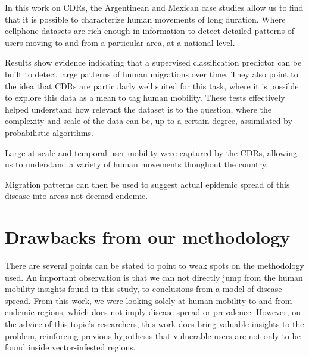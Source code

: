 In this work on CDRs, the Argentinean and Mexican case studies allow us to find that it is possible to characterize human movements of long duration.
Where cellphone datasets are rich enough in information to detect detailed patterns of users moving to and from a particular area, at a national level.


Results show evidence indicating that a supervised classification predictor can be built to detect large patterns of human migrations over time.
They also point to the idea that CDRs are particularly well suited for this task, where it is possible to explore this data as a mean to tag human mobility.
These tests effectively helped understand how relevant the dataset is to the question, where the complexity and scale of the data can be, up to a certain degree, assimilated by probabilistic algorithms.

Large at-scale and temporal user mobility were captured by the CDRs, allowing us to understand a variety of human movements thoughout the country.




Migration patterns can then be used to suggest actual epidemic spread of this disease into areas not deemed endemic.



\section{Drawbacks from our methodology}

There are several points can be stated to point to weak spots on the methodology used.
An important observation is that we can not directly jump from the human mobility insights found in this study, to conclusions from a model of disease spread.
From this work, we were looking solely at human mobility to and from endemic regions, which does not imply disease spread or prevalence.
However, on the advice of this topic's researchers, this work does bring valuable insights to the problem, reinforcing previous hypothesis that vulnerable users are not only to be found inside vector-infested regions.


